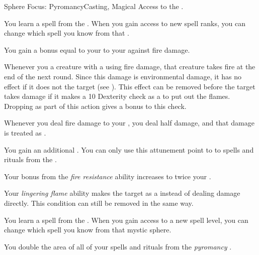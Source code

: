     \begin{feat}{Sphere Focus: Pyromancy}{Casting, Magical}
        \featpre Access to the  .

         You learn a spell from the  .
        When you gain access to new spell ranks, you can change which spell you know from that .

         You gain a bonus equal to your  to your  against fire damage.

         Whenever you  a creature with a  using fire damage, that creature takes  fire  at the end of the next round.
        Since this damage is environmental damage, it has no effect if it does not  the target (see ).
        This effect can be removed before the target takes damage if it makes a  10 Dexterity check as a  to put out the flames.
        Dropping  as part of this action gives a  bonus to this check.

         Whenever you deal fire damage to your , you deal half damage, and that damage is treated as .

         You gain an additional .
        You can only use this attunement point to  to spells and rituals from the  .

         Your bonus from the \textit{fire resistance} ability increases to twice your .

         Your \textit{lingering flame} ability makes the target  as a  instead of dealing damage directly.
        This condition can still be removed in the same way.

         You learn a spell from the  .
        When you gain access to a new spell level, you can change which spell you know from that mystic sphere.

         You double the area of all of your spells and rituals from the \textit{pyromancy} .
    \end{feat}

